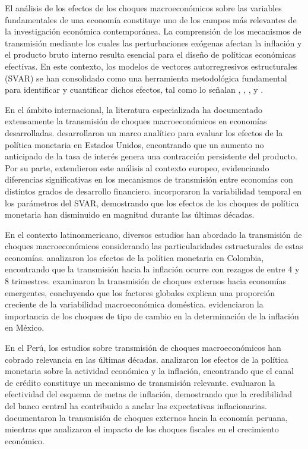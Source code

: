 \documentclass[12pt,a4paper]{article}
\begin{document}
El análisis de los efectos de los choques macroeconómicos sobre las variables fundamentales de una economía constituye uno de los campos más relevantes de la investigación económica contemporánea. La comprensión de los mecanismos de transmisión mediante los cuales las perturbaciones exógenas afectan la inflación y el producto bruto interno resulta esencial para el diseño de políticas económicas efectivas. En este contexto, los modelos de vectores autorregresivos estructurales (SVAR) se han consolidado como una herramienta metodológica fundamental para identificar y cuantificar dichos efectos, tal como lo señalan \citet{blanchard1989}, \citet{sims1980}, \citet{bernanke2005}, \citet{kilian2017} y \citet{stock2001}.

En el ámbito internacional, la literatura especializada ha documentado extensamente la transmisión de choques macroeconómicos en economías desarrolladas. \citet{christiano1999} desarrollaron un marco analítico para evaluar los efectos de la política monetaria en Estados Unidos, encontrando que un aumento no anticipado de la tasa de interés genera una contracción persistente del producto. Por su parte, \citet{favero2005} extendieron este análisis al contexto europeo, evidenciando diferencias significativas en los mecanismos de transmisión entre economías con distintos grados de desarrollo financiero. \citet{primiceri2005} incorporaron la variabilidad temporal en los parámetros del SVAR, demostrando que los efectos de los choques de política monetaria han disminuido en magnitud durante las últimas décadas.

En el contexto latinoamericano, diversos estudios han abordado la transmisión de choques macroeconómicos considerando las particularidades estructurales de estas economías. \citet{restrepo2015} analizaron los efectos de la política monetaria en Colombia, encontrando que la transmisión hacia la inflación ocurre con rezagos de entre 4 y 8 trimestres. \citet{caporale2018} examinaron la transmisión de choques externos hacia economías emergentes, concluyendo que los factores globales explican una proporción creciente de la variabilidad macroeconómica doméstica. \citet{chiquiar2016} evidenciaron la importancia de los choques de tipo de cambio en la determinación de la inflación en México.

En el Perú, los estudios sobre transmisión de choques macroeconómicos han cobrado relevancia en las últimas décadas. \citet{castillo2018} analizaron los efectos de la política monetaria sobre la actividad económica y la inflación, encontrando que el canal de crédito constituye un mecanismo de transmisión relevante. \citet{winkelried2016} evaluaron la efectividad del esquema de metas de inflación, demostrando que la credibilidad del banco central ha contribuido a anclar las expectativas inflacionarias. \citet{llontop2019} documentaron la transmisión de choques externos hacia la economía peruana, mientras que \citet{rojas2020} analizaron el impacto de los choques fiscales en el crecimiento económico.
\end{document}
